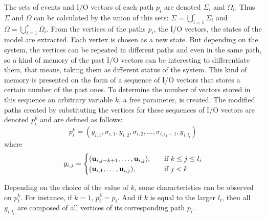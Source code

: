 The sets of events and I\slash O vectors of each path $p_i$ are denoted $\Sigma_i$
and $\Omega_i$. Thus $\Sigma$ and $\Omega$ can be calculated by the union of
this sets: $\Sigma=\bigcup_{i=1}^r\Sigma_i$ and
$\Omega=\bigcup_{i=1}^r\Omega_i$.
From the vertices of the paths $p_i$, the I\slash O vectors, the states of the model are extracted.
Each vertex is chosen as a new state. But depending on the system, the vertices
can be repeated in different paths and even in the same path, so a kind of
memory of the past I\slash O vectors can be interesting to differentiate them,
that means, taking them as different status of the system. This kind of memory
is presented on the form of a sequence of I\slash O vectors that stores a
certain number of the past ones. To determine the number of vectors stored in this sequence an
arbitrary variable $k$, a free parameter, is created. 
The modified paths created by substituting the vertices for these sequences of
I\slash O vectors are
denoted $p_i^k$ and are defined as follows:
\begin{equation}
  \label{eq:modifiedPath}
 p_i^k= (y_{i,1},\sigma_{i,1},y_{i,2},\sigma_{i,2},\dots,\sigma_{i,l_1-1},y_{i,l_i}) 
\end{equation}
where 
\begin{equation}
  \label{eq:modifiedPathb}
y_{i,j}=\begin{cases}
    (\mathbf{u}_{i,j-k+1},\dots,\mathbf{u}_{i,j}),& \quad \text{if } k\leq j\leq l_i\\
    (\mathbf{u}_{i,1},\dots,\mathbf{u}_{i,j}),  & \quad \text{if } j<k
  \end{cases}
\end{equation}

\begin{observation}
Depending on the choice of the value of $k$, some characteristics can be
observed on $p_i^k$. For instance, if $k=1$, $p_i^k=p_i$. And if $k$ is equal to
the larger $l_i$, then all $y_{i,l_i}$ are composed of all vertices of its
corresponding path $p_i$.
\end{observation}

